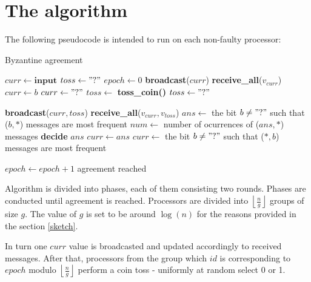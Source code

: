 \documentclass{article}
\begin{document}
\section{The algorithm}

The following pseudocode is intended to run on each non-faulty processor:

\begin{algorithm}[H]
  \caption{Byzantine agreement} \label{algo}
  \begin{algorithmic}[1]
    \State $curr \leftarrow \textbf{input}$
    \State $toss \leftarrow "?"$
    \State $epoch \leftarrow 0$
    \Repeat
        \State \textbf{broadcast}($curr$) 
        \State \textbf{receive\_all}($v_{curr}$)
            \State $curr \leftarrow b$
        \Else
            \State $curr \leftarrow "?"$
        \EndIf
            \State $toss \leftarrow$ \textbf{toss\_coin()}
        \Else
            \State $toss \leftarrow "?"$
        \EndIf
        
        \State
        
        \State \textbf{broadcast}($curr,toss$) 
        \State \textbf{receive\_all}($v_{curr},v_{toss}$)
        \State $ans \leftarrow$ the bit $b \neq "?"$ such that ($b,*$) messages are most frequent
        \State $num \leftarrow$ number of ocurrences of ($ans,*$) messages
            \State \textbf{decide} $ans$ 
            \State \Return
            \State $curr \leftarrow ans$
        \Else
            \State $curr \leftarrow$ the bit $b \neq "?"$ such that ($*,b$) messages are most frequent
        \EndIf
        
        \State $epoch \leftarrow epoch+1$
    \Until agreement reached
  \end{algorithmic}
\end{algorithm}


Algorithm is divided into phases, each of them consisting two rounds. Phases are conducted until agreement is reached. Processors are divided into $\left \lfloor \frac{n}{g} \right \rfloor$ groups of size $g$. The value of $g$ is set to be around $\log(n)$ for the reasons provided in the section \ref{sketch}.

In turn one $curr$ value is broadcasted and updated accordingly to received messages. After that, processors from the group which $id$ is corresponding to $epoch$ modulo $\left \lfloor \frac{n}{g} \right \rfloor$ perform a coin toss - uniformly at random select 0 or 1.
\end{document}
